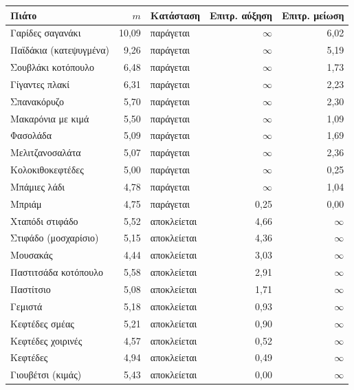 \setlength{\tabcolsep}{6pt}
\begin{tabular}{@{}lrlrr@{}}
\toprule
\textbf{Πιάτο} & $m$ & \textbf{Κατάσταση} & \textbf{Επιτρ. αύξηση} & \textbf{Επιτρ. μείωση} \\
\midrule
Γαρίδες σαγανάκι & 10,09 & παράγεται & $\infty$ & 6,02 \\
Παϊδάκια (κατεψυγμένα) & 9,26 & παράγεται & $\infty$ & 5,19 \\
Σουβλάκι κοτόπουλο & 6,48 & παράγεται & $\infty$ & 1,73 \\
Γίγαντες πλακί & 6,31 & παράγεται & $\infty$ & 2,23 \\
Σπανακόρυζο & 5,70 & παράγεται & $\infty$ & 2,30 \\
Μακαρόνια με κιμά & 5,50 & παράγεται & $\infty$ & 1,09 \\
Φασολάδα & 5,09 & παράγεται & $\infty$ & 1,69 \\
Μελιτζανοσαλάτα & 5,07 & παράγεται & $\infty$ & 2,36 \\
Κολοκιθοκεφτέδες & 5,00 & παράγεται & $\infty$ & 0,25 \\
Μπάμιες λάδι & 4,78 & παράγεται & $\infty$ & 1,04 \\
Μπριάμ & 4,75 & παράγεται & 0,25 & 0,00 \\
\addlinespace
Χταπόδι στιφάδο & 5,52 & αποκλείεται & 4,66 & $\infty$ \\
Στιφάδο (μοσχαρίσιο) & 5,15 & αποκλείεται & 4,36 & $\infty$ \\
Μουσακάς & 4,44 & αποκλείεται & 3,03 & $\infty$ \\
Παστιτσάδα κοτόπουλο & 5,58 & αποκλείεται & 2,91 & $\infty$ \\
Παστίτσιο & 5,08 & αποκλείεται & 1,71 & $\infty$ \\
Γεμιστά & 5,18 & αποκλείεται & 0,93 & $\infty$ \\
Κεφτέδες σμέας & 5,21 & αποκλείεται & 0,90 & $\infty$ \\
Κεφτέδες χοιρινές & 4,57 & αποκλείεται & 0,52 & $\infty$ \\
Κεφτέδες & 4,94 & αποκλείεται & 0,49 & $\infty$ \\
Γιουβέτσι (κιμάς) & 5,43 & αποκλείεται & 0,00 & $\infty$ \\
\bottomrule
\end{tabular}
